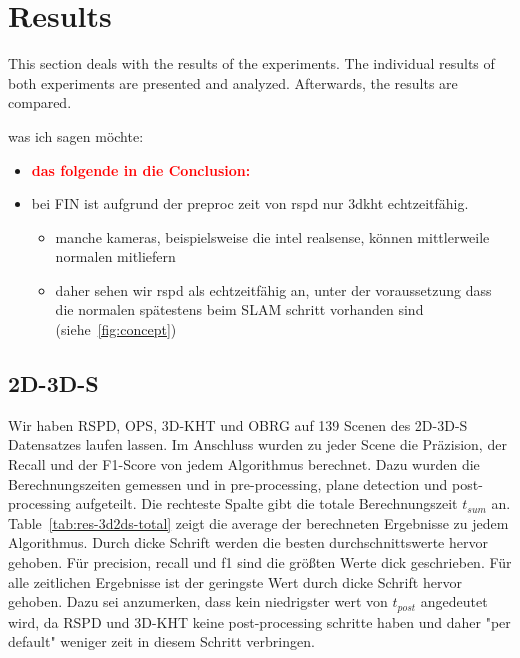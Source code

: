 \documentclass[main.tex]{subfiles}
\begin{document}
\section{Results}
This section deals with the results of the experiments. 
The individual results of both experiments are presented and analyzed. Afterwards, the results are compared.

was ich sagen möchte:
\begin{itemize}
    \item \textbf{\textcolor{red}{das folgende in die Conclusion:}}
    \item bei FIN ist aufgrund der preproc zeit von rspd nur 3dkht echtzeitfähig.
          \begin{itemize}
              \item manche kameras, beispielsweise die intel realsense, können mittlerweile normalen mitliefern
              \item daher sehen wir rspd als echtzeitfähig an, unter der voraussetzung dass die normalen spätestens beim SLAM schritt vorhanden
                    sind (siehe~\ref{fig:concept})
          \end{itemize}
\end{itemize}

\subsection{2D-3D-S}

Wir haben RSPD, OPS, 3D-KHT und OBRG auf 139 Scenen des 2D-3D-S Datensatzes laufen lassen. Im Anschluss wurden zu jeder Scene die Präzision,
der Recall und der F1-Score von jedem Algorithmus berechnet. Dazu wurden die Berechnungszeiten gemessen und in pre-processing, plane detection und
post-processing aufgeteilt. Die rechteste Spalte gibt die totale Berechnungszeit $t_{sum}$ an. Table~\ref{tab:res-3d2ds-total} zeigt die average der berechneten Ergebnisse zu jedem Algorithmus. Durch dicke Schrift
werden die besten durchschnittswerte hervor gehoben. Für precision, recall und f1 sind die größten Werte dick geschrieben. Für alle zeitlichen
Ergebnisse ist der geringste Wert durch dicke Schrift hervor gehoben. Dazu sei anzumerken, dass kein niedrigster wert von $t_{post}$ angedeutet 
wird, da RSPD und 3D-KHT keine post-processing schritte haben und daher "per default" weniger zeit in diesem Schritt verbringen.
\end{document}
